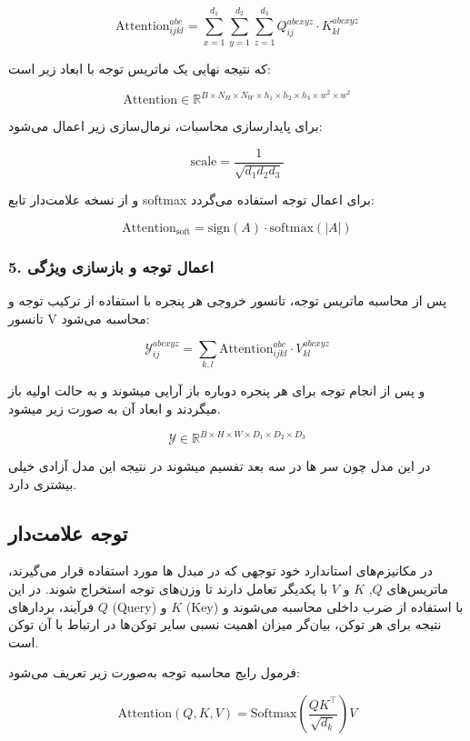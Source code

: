 \[
\text{Attention}_{ijkl}^{abc} = \sum_{x=1}^{d_1} \sum_{y=1}^{d_2} \sum_{z=1}^{d_3} Q_{ij}^{abcxyz} \cdot K_{kl}^{abcxyz}
\]

که نتیجه نهایی یک ماتریس توجه با ابعاد زیر است:

\[
\text{Attention} \in \mathbb{R}^{B \times N_H \times N_W \times h_1 \times h_2 \times h_3 \times w^2 \times w^2}
\]

برای پایدارسازی محاسبات، نرمال‌سازی زیر اعمال می‌شود:

\[
\text{scale} = \frac{1}{\sqrt{d_1 d_2 d_3}}
\]

و از نسخه علامت‌دار تابع softmax برای اعمال توجه استفاده می‌گردد:

\[
\text{Attention}_{\text{soft}} = \text{sign}(A) \cdot \text{softmax}(|A|)
\]

\subsubsection*{5. اعمال توجه و بازسازی ویژگی}

پس از محاسبه ماتریس توجه، تانسور خروجی هر پنجره با استفاده از ترکیب توجه و تانسور V محاسبه می‌شود:

\[
\mathcal{Y}_{ij}^{abcxyz} = \sum_{k,l} \text{Attention}_{ijkl}^{abc} \cdot V_{kl}^{abcxyz}
\]

و پس از انجام توجه برای هر پنجره دوباره باز آرایی میشوند و به حالت اولیه باز میگردند و ابعاد آن به صورت زیر میشود.

\[
\mathcal{Y} \in \mathbb{R}^{B \times H \times W \times D_1 \times D_2 \times D_3}
\]

در این مدل چون سر ها در سه بعد تفسیم میشوند در نتیجه این مدل آزادی خیلی بیشتری دارد.






\subsection{توجه علامت‌دار}

در مکانیزم‌های استاندارد خود توجهی که در مبدل ها مورد استفاده قرار می‌گیرند، ماتریس‌های $Q$, $K$ و $V$ با یکدیگر تعامل دارند تا وزن‌های توجه استخراج شوند. در این فرآیند، بردارهای $Q$ (Query) و $K$ (Key) با استفاده از ضرب داخلی محاسبه می‌شوند و نتیجه برای هر توکن، بیان‌گر میزان اهمیت نسبی سایر توکن‌ها در ارتباط با آن توکن است.

فرمول رایج محاسبه توجه به‌صورت زیر تعریف می‌شود:

\[
\text{Attention}(Q, K, V) = \text{Softmax}\left( \frac{QK^\top}{\sqrt{d_k}} \right) V
\]

